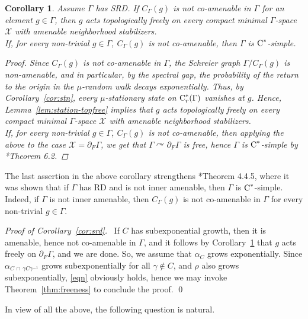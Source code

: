 \documentclass[12pt]{amsart}
\newtheorem{cor}[theorem]{Corollary}
\theoremstyle{definition}
\theoremstyle{remark}
\newcommand{\act}{\curvearrowright}
\newcommand{\g}{\gamma}
\newcommand{\G}{\Gamma}
\begin{document}
\begin{cor}\label{cor:Oles}
Assume $\G$ has {\rm SRD}. If $C_\G(g)$ is not co-amenable in $\G$ for an element $g\in \G$, then $g$ acts topologically freely on every compact minimal $\Gamma$-space $\mathcal{X}$ with amenable neighborhood stabilizers.\\ If, for every non-trivial $g\in\G$, $C_\G(g)$ is not co-amenable, then $\G$ is $\textup{C}^*$-simple.

\begin{proof}
Since $C_\G(g)$ is not co-amenable in $\G$, the Schreier graph $\G/C_\G(g)$ is non-amenable, and in particular, by the spectral gap, the probability of the return to the origin in the $\mu$-random walk decays exponentially. Thus, by  Corollary~\ref{cor:stn}, every $\mu$-stationary state on $\textup{C}^*_r(\G)$ vanishes at $g$. Hence, Lemma~\ref{lem:station-topfree} implies that $g$ acts topologically freely on every compact minimal $\Gamma$-space $\mathcal{X}$ with amenable neighborhood stabilizers.
\\
If, for every non-trivial $g\in\G$, $C_\G(g)$ is not co-amenable, then applying the above to the case $\mathcal{X}=\partial_F\G$, we get that $\G\act \partial_F\G$ is free, hence $\G$ is $\textup{C}^*$-simple by \cite{KK14}*{Theorem 6.2}.
\end{proof}
\end{cor}

The last assertion in the above corollary strengthens \cite{Olesen2016}*{Theorem 4.4.5}, where it was shown that if $\G$ has \textup{RD} and is not inner amenable, then $\G$ is $\textup{C}^*$-simple. 
Indeed, if $\G$ is not inner amenable, then $C_\G(g)$ is not co-amenable in $\G$ for every non-trivial $g\in\G$. 

\medskip

\noindent
{\it Proof of Corollary~\ref{cor:srd}.}~
If $C$ has subexponential growth, then it is amenable, hence not co-amenable in $\G$, and it follows by Corollary~\ref{cor:Oles} that $g$ acts freely on $\partial_F\G$, and we are done. So, we assume that $\alpha_{\scriptscriptstyle C}$ grows exponentially. Since $\alpha_{\scriptscriptstyle C\,\cap\, \g C\g^{-1}}$ grows subexponentially for all $\g\notin C$, and $\rho$ also grows subexponentially,  \eqref{eqn} obviously holds, hence we may invoke Theorem~\ref{thm:freeness} to conclude the proof. \qed


\medskip

In view of all the above, the following question is natural.
\end{document}
